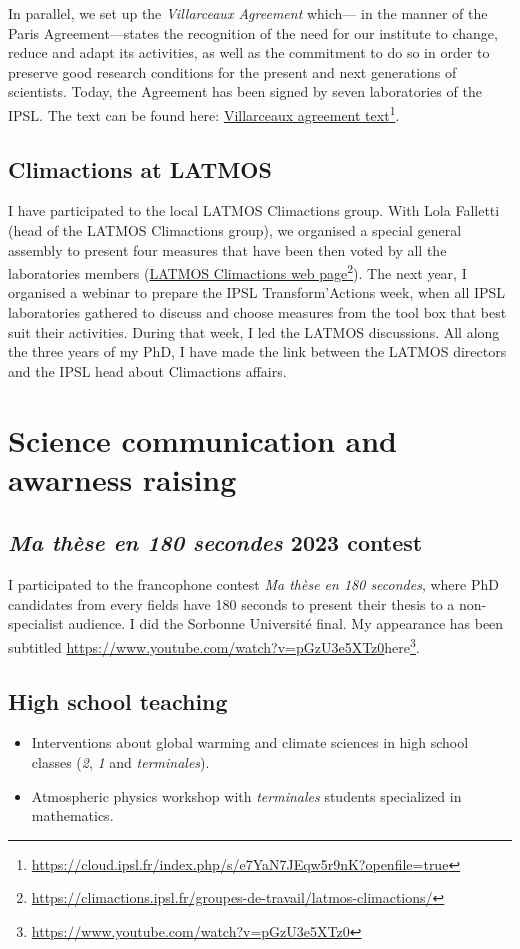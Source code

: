     In parallel, we set up the \textit{Villarceaux Agreement} which\---- in the manner of the Paris Agreement\----states the recognition of the need for our institute to change, reduce and adapt its activities, as well as the commitment to do so in order to preserve good research conditions for the present and next generations of scientists.
    Today, the Agreement has been signed by seven laboratories of the IPSL. The text can be found here: \href{https://cloud.ipsl.fr/index.php/s/e7YaN7JEqw5r9nK?openfile=true}{Villarceaux agreement text}\footnote{\url{https://cloud.ipsl.fr/index.php/s/e7YaN7JEqw5r9nK?openfile=true}}.

    \subsection*{Climactions at LATMOS}
    I have participated to the local LATMOS Climactions group. With Lola Falletti (head of the LATMOS Climactions group), we organised a special general assembly to present four measures that have been then voted by all the laboratories members (\href{https://climactions.ipsl.fr/groupes-de-travail/latmos-climactions/}{LATMOS Climactions web page}\footnote{\url{https://climactions.ipsl.fr/groupes-de-travail/latmos-climactions/}}).
    The next year, I organised a webinar to prepare the IPSL Transform'Actions week, when all IPSL laboratories gathered to discuss and choose measures from the tool box that best suit their activities.
    During that week, I led the LATMOS discussions.
    All along the three years of my PhD, I have made the link between the LATMOS directors and the IPSL head about Climactions affairs.


\section*{Science communication and awarness raising}
    \subsection*{\textit{Ma thèse en 180 secondes} 2023 contest}
    I participated to the francophone contest \textit{Ma thèse en 180 secondes}, where PhD candidates from every fields have 180 seconds to present their thesis to a non-specialist audience. I did the Sorbonne Université final. My appearance has been subtitled \url{https://www.youtube.com/watch?v=pGzU3e5XTz0}{here}\footnote{\url{https://www.youtube.com/watch?v=pGzU3e5XTz0}}.

    \subsection*{High school teaching}
        \begin{itemize}
            \item Interventions about global warming and climate sciences in high school classes (\textit{2}, \textit{1} and \textit{terminales}).
            \item Atmospheric physics workshop with \textit{terminales} students specialized in mathematics. 
        \end{itemize}



